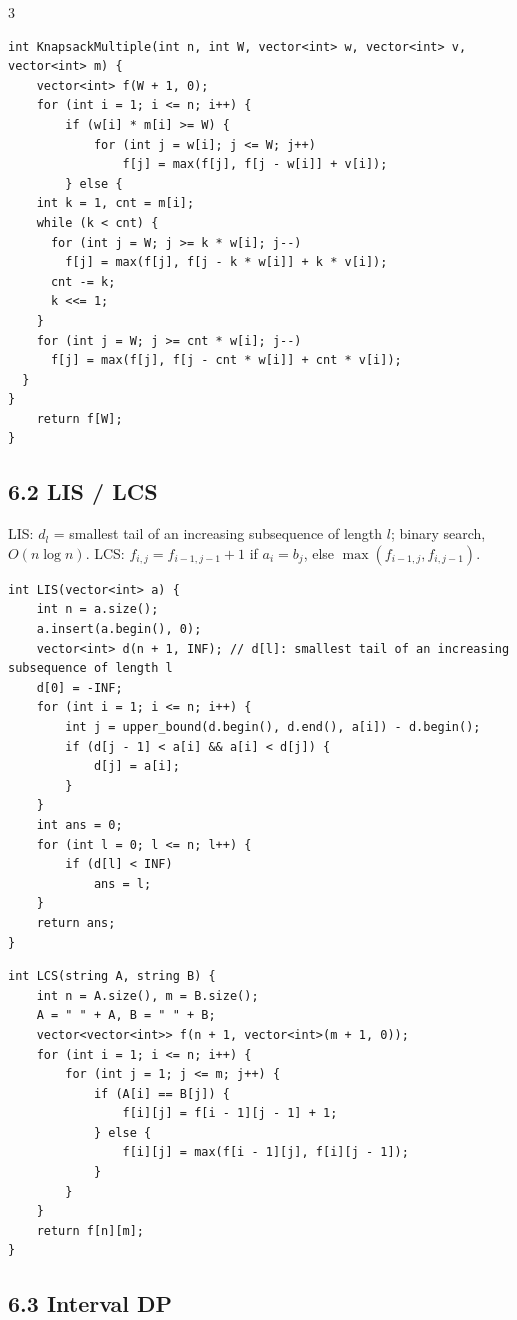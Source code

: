 \documentclass[8pt]{extarticle}
\begin{document}
\begin{multicols*}{3}
\begin{lstlisting}
int KnapsackMultiple(int n, int W, vector<int> w, vector<int> v, vector<int> m) {
    vector<int> f(W + 1, 0);
    for (int i = 1; i <= n; i++) {
        if (w[i] * m[i] >= W) {
            for (int j = w[i]; j <= W; j++)
                f[j] = max(f[j], f[j - w[i]] + v[i]);
        } else {
    int k = 1, cnt = m[i];
    while (k < cnt) {
      for (int j = W; j >= k * w[i]; j--)
        f[j] = max(f[j], f[j - k * w[i]] + k * v[i]);
      cnt -= k;
      k <<= 1;
    }
    for (int j = W; j >= cnt * w[i]; j--)
      f[j] = max(f[j], f[j - cnt * w[i]] + cnt * v[i]);
  }
}
    return f[W];
}
\end{lstlisting}

\subsection*{6.2 LIS / LCS}

LIS: $d_l$ = smallest tail of an increasing subsequence of length $l$; binary search, $O(n \log n)$. LCS: $f_{i,j} = f_{i-1,j-1} + 1$ if $a_i = b_j$, else $\max(f_{i-1,j}, f_{i,j-1})$.


\begin{lstlisting}
int LIS(vector<int> a) {
    int n = a.size();
    a.insert(a.begin(), 0);
    vector<int> d(n + 1, INF); // d[l]: smallest tail of an increasing subsequence of length l
    d[0] = -INF;
    for (int i = 1; i <= n; i++) {
        int j = upper_bound(d.begin(), d.end(), a[i]) - d.begin();
        if (d[j - 1] < a[i] && a[i] < d[j]) {
            d[j] = a[i];
        }
    }
    int ans = 0;
    for (int l = 0; l <= n; l++) {
        if (d[l] < INF)
            ans = l;
    }
    return ans;
}
\end{lstlisting}

\begin{lstlisting}
int LCS(string A, string B) {
    int n = A.size(), m = B.size();
    A = " " + A, B = " " + B;
    vector<vector<int>> f(n + 1, vector<int>(m + 1, 0));
    for (int i = 1; i <= n; i++) {
        for (int j = 1; j <= m; j++) {
            if (A[i] == B[j]) {
                f[i][j] = f[i - 1][j - 1] + 1;
            } else {
                f[i][j] = max(f[i - 1][j], f[i][j - 1]);
            }
        }
    }
    return f[n][m];
}
\end{lstlisting}

\subsection*{6.3 Interval DP}


\end{multicols*}
\end{document}
